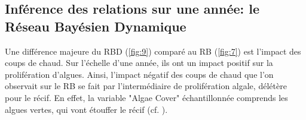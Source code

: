 \documentclass[12pt]{report}
\begin{document}

        \subsection{Inférence des relations sur une année: le Réseau Bayésien Dynamique}

Une différence majeure du RBD (\autoref{fig:9}) comparé au RB (\autoref{fig:7}) est l'impact des coups de chaud. Sur l'échelle d'une année, ils ont un impact positif sur la prolifération d'algues. Ainsi, l'impact négatif des coups de chaud que l'on observait sur le RB se fait par l'intermédiaire de prolifération algale, délétère pour le récif. En effet, la variable "Algae Cover" échantillonnée comprends les algues vertes, qui vont étouffer le récif (cf. ).
\newline 
\end{document}
